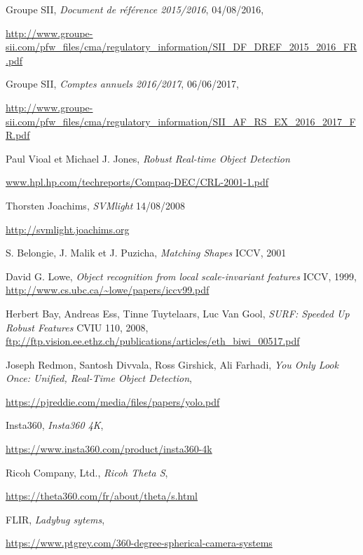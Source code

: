 \begin{thebibliography}{9}
	
		Groupe SII,
		\emph{Document de référence 2015/2016},
		04/08/2016,
		\par
		\url{http://www.groupe-sii.com/pfw_files/cma/regulatory_information/SII_DF_DREF_2015_2016_FR.pdf}
	
		Groupe SII,
		\emph{Comptes annuels 2016/2017},
		06/06/2017,
		\par
		\url{http://www.groupe-sii.com/pfw_files/cma/regulatory_information/SII_AF_RS_EX_2016_2017_FR.pdf}
	
		Paul Vioal et Michael J. Jones,
		\emph{Robust Real-time Object Detection}
		\par
		\url{www.hpl.hp.com/techreports/Compaq-DEC/CRL-2001-1.pdf}
	
		Thorsten Joachims,
		\emph{SVMlight}
		14/08/2008
		\par
		\url{http://svmlight.joachims.org}
	
		S. Belongie, J. Malik et J. Puzicha,
		\emph{Matching Shapes}
		ICCV,
		2001

		David G. Lowe,
		\emph{Object recognition from local scale-invariant features}
		ICCV,
		1999,
		\url{http://www.cs.ubc.ca/~lowe/papers/iccv99.pdf}

		Herbert Bay, Andreas Ess, Tinne Tuytelaars, Luc Van Gool,
		\emph{SURF: Speeded Up Robust Features}
		CVIU 110,
		2008,
		\url{ftp://ftp.vision.ee.ethz.ch/publications/articles/eth_biwi_00517.pdf}
	
		Joseph Redmon, Santosh Divvala, Ross Girshick, Ali Farhadi,
		\emph{You Only Look Once: Unified, Real-Time Object Detection},
		\par
		\url{https://pjreddie.com/media/files/papers/yolo.pdf}
	
		Insta360,
		\emph{Insta360 4K},
		\par
		\url{https://www.insta360.com/product/insta360-4k}
	
		Ricoh Company, Ltd.,
		\emph{Ricoh Theta S},
		\par
		\url{https://theta360.com/fr/about/theta/s.html}
	
		FLIR,
		\emph{Ladybug sytems},
		\par
		\url{https://www.ptgrey.com/360-degree-spherical-camera-systems}
		

\end{thebibliography}
